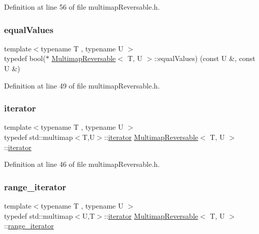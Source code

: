 Definition at line 56 of file multimap\+Reversable.\+h.

\mbox{\label{classMultimapReversable_a73c1b30be5bb8d65b1bcfa5e0958a581}} 
\subsubsection{\texorpdfstring{equal\+Values}{equalValues}}
{\footnotesize\ttfamily template$<$typename T , typename U $>$ \\
typedef bool($\ast$ \hyperlink{classMultimapReversable}{Multimap\+Reversable}$<$ T, U $>$\+::equal\+Values) (const U \&, const U \&)\hspace{0.3cm}{\ttfamily [private]}}



Definition at line 49 of file multimap\+Reversable.\+h.

\mbox{\label{classMultimapReversable_a4a255d95792e4ab19a4d903c27938156}} 
\subsubsection{\texorpdfstring{iterator}{iterator}}
{\footnotesize\ttfamily template$<$typename T , typename U $>$ \\
typedef std\+::multimap$<$T,U$>$\+::\hyperlink{classMultimapReversable_a4a255d95792e4ab19a4d903c27938156}{iterator} \hyperlink{classMultimapReversable}{Multimap\+Reversable}$<$ T, U $>$\+::\hyperlink{classMultimapReversable_a4a255d95792e4ab19a4d903c27938156}{iterator}\hspace{0.3cm}{\ttfamily [private]}}



Definition at line 46 of file multimap\+Reversable.\+h.

\mbox{\label{classMultimapReversable_a206be6b005bde9b1a6d3abfa36ca370f}} 
\subsubsection{\texorpdfstring{range\+\_\+iterator}{range\_iterator}}
{\footnotesize\ttfamily template$<$typename T , typename U $>$ \\
typedef std\+::multimap$<$U,T$>$\+::\hyperlink{classMultimapReversable_a4a255d95792e4ab19a4d903c27938156}{iterator} \hyperlink{classMultimapReversable}{Multimap\+Reversable}$<$ T, U $>$\+::\hyperlink{classMultimapReversable_a206be6b005bde9b1a6d3abfa36ca370f}{range\+\_\+iterator}\hspace{0.3cm}{\ttfamily [private]}}



